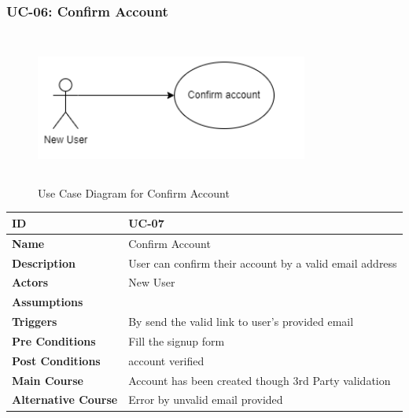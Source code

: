     \subsubsection{UC-06: Confirm Account}
    \begin{figure}[H]
        \includegraphics[height=5cm, width=0.8\textwidth]{./diagrams/Use Case/u6.png}
        \centering 
        \caption{Use Case Diagram for Confirm Account}
        \label{fig:Usecase1}
        \end{figure}
        
    \begin{center}
        \begin{tabularx}{\textwidth}{|l|X|}
            \hline
            \textbf{ID} & UC-07 \\
            \hline
            \textbf{Name} & Confirm Account \\
            \hline
            \textbf{Description} & User can confirm their account by a valid email address \\
            \hline
            \textbf{Actors} & New User \\
            \hline
            \textbf{Assumptions} &  \\
            \hline
            \textbf{Triggers} & By send the valid link to user's provided email \\
            \hline
            \textbf{Pre Conditions} & Fill the signup form \\
            \hline
            \textbf{Post Conditions} & account verified \\
            \hline
            \textbf{Main Course} & Account has been created though 3rd Party validation \\
            \hline
            \textbf{Alternative Course} & Error by unvalid email provided \\
            \hline
            
        \end{tabularx}
    \end{center}
    \newpage
    

